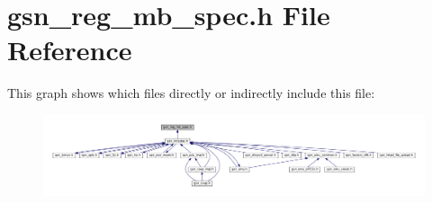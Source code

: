 \hypertarget{a00562}{
\section{gsn\_\-reg\_\-mb\_\-spec.h File Reference}
\label{a00562}
}
This graph shows which files directly or indirectly include this file:
\nopagebreak
\begin{figure}[H]
\begin{center}
\leavevmode
\includegraphics[width=400pt]{a00798}
\end{center}
\end{figure}
